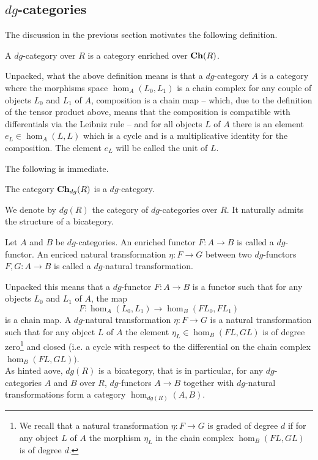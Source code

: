 \subsection{$dg$-categories}\label{se:dgcat}
The discussion in the previous section motivates the following definition.
\begin{dfn}
    A $dg$-category over $R$ is a category enriched over $\mathbf{Ch}(R)$.
\end{dfn}
Unpacked, what the above definition means is that a $dg$-category $A$ is a category where the morphisms space $\hom_A(L_0,L_1)$ is a chain complex for any couple of objects $L_0$ and $L_1$ of $A$, composition is a chain map -- which, due to the definition of the tensor product above, means that the composition is compatible with differentials via the Leibniz rule -- and for all objects $L$ of $A$ there is an element $e_L\in \hom_A(L,L)$ which is a cycle and is a multiplicative identity for the composition. The element $e_L$ will be called the unit of $L$.

The following is immediate.

\begin{lem}
    The category $\mathbf{Ch}_{dg}(R)$ is a $dg$-category.
\end{lem}

\noindent We denote by $dg(R)$ the category of $dg$-categories over $R$. It naturally admits the structure of a bicategory.
\begin{dfn}
    Let $A$ and $B$ be $dg$-categories. An enriched functor $F\colon A\to B$ is called a $dg$-functor. An enriced natural transformation $\eta\colon F\to G$ between two $dg$-functors $F,G\colon A\to B$ is called a $dg$-natural transformation.
\end{dfn}
\noindent Unpacked this means that a $dg$-functor $F\colon A\to B$ is a functor such that for any objects $L_0$ and $L_1$ of $A$, the map $$F\colon \hom_A(L_0,L_1)\to \hom_B(FL_0,FL_1)$$ is a chain map. A $dg$-natural transformation $\eta\colon F\to G$ is a natural transformation such that for any object $L$ of $A$ the element $\eta_L\in \hom_B(FL,GL)$ is of degree zero\footnote{We recall that a natural transformation $\eta\colon F\to G$ is graded of degree $d$ if for any object $L$ of $A$ the morphism $\eta_L$ in the chain complex $\hom_B(FL,GL)$ is of degree $d$.} and closed (i.e. a cycle with respect to the differential on the chain complex $\hom_B(FL,GL))$.\\
As hinted aove, $dg(R)$ is a bicategory, that is in particular, for any $dg$-categories $A$ and $B$ over $R$, $dg$-functors $A\to B$ together with $dg$-natural transformations form a category $\hom_{dg(R)}(A,B)$.

